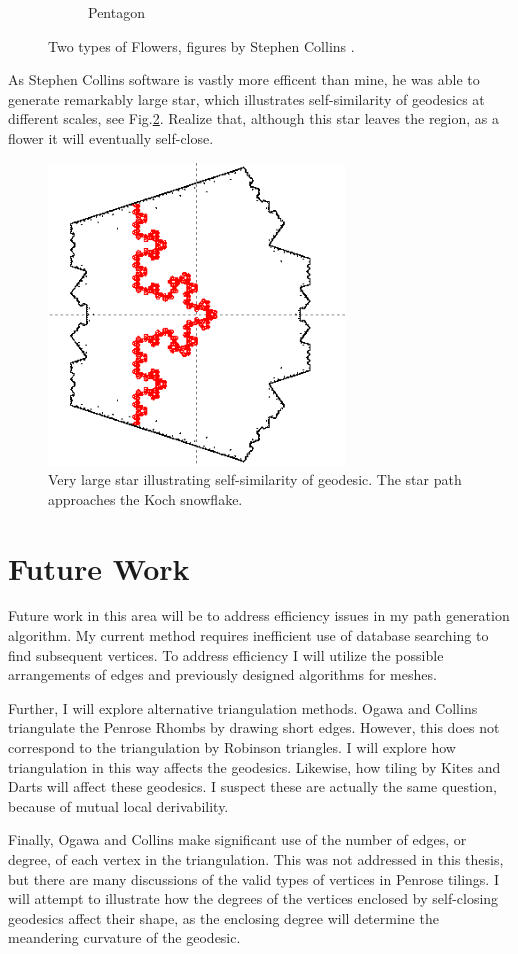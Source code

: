 \documentclass[
  oneside,
  11pt, a4paper,
  footinclude=true,
  headinclude=true,
  cleardoublepage=empty
]{scrbook}
\begin{document}
\begin{figure}[H]
\begin{subfigure}[b]{0.45\textwidth}
\caption[Pentagon]{Pentagon}
\end{subfigure}
\caption[Rings]{Two types of Flowers, figures by Stephen Collins \cite{Collins}.}
\label{fig:collinsflowers}
\end{figure}
As Stephen Collins software is vastly more efficent than mine, he was able to generate remarkably large star, which illustrates self-similarity of geodesics at different scales, see Fig.\ref{fig:Koch}. Realize that, although this star leaves the region, as a flower it will eventually self-close. 
\begin{figure}[H]
\centering
\includegraphics[width=0.7\textwidth]{Koch}
\caption[Koch]{Very large star illustrating self-similarity of geodesic. The star path approaches the Koch snowflake. \cite{Collins}}
\label{fig:Koch}
\end{figure}

\section{Future Work}
Future work in this area will be to address efficiency issues in my path generation algorithm. My current method requires inefficient use of database searching to find subsequent vertices. To address efficiency I will utilize the possible arrangements of edges and previously designed algorithms for meshes. 

Further, I will explore alternative triangulation methods. Ogawa and Collins triangulate the Penrose Rhombs by drawing short edges. However, this does not correspond to the triangulation by Robinson triangles. I will explore how triangulation in this way affects the geodesics. Likewise, how tiling by Kites and Darts will affect these geodesics. I suspect these are actually the same question, because of mutual local derivability.

Finally, Ogawa and Collins make significant use of the number of edges, or degree, of each vertex in the triangulation. This was not addressed in this thesis, but there are many discussions of the valid types of vertices in Penrose tilings. I will attempt to illustrate how the degrees of the vertices enclosed by self-closing geodesics affect their shape, as the enclosing degree will determine the meandering curvature of the geodesic. 


    
\end{document}
